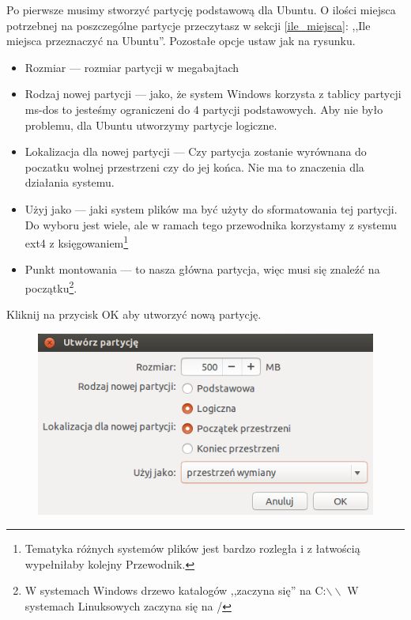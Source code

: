 Po pierwsze musimy stworzyć partycję podstawową dla Ubuntu. O ilości miejsca potrzebnej na poszczególne partycje przeczytasz w sekcji \ref{ile_miejsca}: ,,Ile miejsca przeznaczyć na Ubuntu''. Pozostałe opcje ustaw jak na rysunku.
\begin{itemize}
\item \textcolor{ubuntu_orange}{Rozmiar} --- rozmiar partycji w megabajtach
\item \textcolor{ubuntu_orange}{Rodzaj nowej partycji} --- jako, że system Windows korzysta z tablicy partycji ms-dos to jesteśmy ograniczeni do 4 partycji podstawowych. Aby nie było problemu, dla Ubuntu utworzymy partycje logiczne.
\item \textcolor{ubuntu_orange}{Lokalizacja dla nowej partycji} --- Czy partycja zostanie wyrównana do poczatku wolnej przestrzeni czy do jej końca. Nie ma to znaczenia dla działania systemu.
\item \textcolor{ubuntu_orange}{Użyj jako} --- jaki system plików ma być użyty do sformatowania tej partycji. Do wyboru jest wiele, ale w ramach tego przewodnika korzystamy z systemu ext4 z księgowaniem\footnote{Tematyka różnych systemów plików jest bardzo rozległa i z łatwością wypełniłaby kolejny Przewodnik.}
\item \textcolor{ubuntu_orange}{Punkt montowania} --- to nasza główna partycja, więc musi się znaleźć na początku\footnote{W systemach Windows drzewo katalogów ,,zaczyna się'' na C:$\backslash\backslash$ W systemach Linuksowych zaczyna się na /}.
\end{itemize}
Kliknij na przycisk \textcolor{ubuntu_orange}{OK} aby utworzyć nową partycję.
\clearpage
\begin{figure}
                \includegraphics[width=\linewidth]{images/instalator_partycjonowanie_gparted_dodaj_swap.png}
\end{figure}
